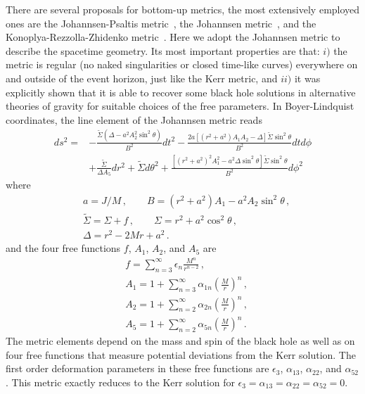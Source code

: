 \documentclass[11pt,a4paper,pdftex]{article}
\begin{document}
There are several proposals for bottom-up metrics, the most extensively employed ones are the Johannsen-Psaltis metric~\cite{JPmetric}, the Johannsen metric~\cite{johannsen_metric}, and the Konoplya-Rezzolla-Zhidenko metric~\cite{KRZmetric}. Here we adopt the Johannsen metric to describe the spacetime geometry. Its most important properties are that: $i)$ the metric is regular (no naked singularities or closed time-like curves) everywhere on and outside of the event horizon, just like the Kerr metric, and $ii)$ it was explicitly shown that it is able to recover some black hole solutions in alternative theories of gravity for suitable choices of the free parameters. In Boyer-Lindquist coordinates, the line element of the Johannsen metric reads~\cite{johannsen_metric}
\begin{align}
ds^2=&-\frac{\tilde{\Sigma}\left(\Delta-a^2A_2^2\sin^2\theta\right)}{B^2}dt^2
-\frac{2a\left[\left(r^2+a^2\right)A_1A_2-\Delta\right]\tilde{\Sigma}\sin^2\theta}{B^2}dtd\phi \nonumber\\
&+\frac{\tilde{\Sigma}}{\Delta A_5}dr^2+\tilde{\Sigma}d\theta^2
+\frac{\left[\left(r^2+a^2\right)^2A_1^2-a^2\Delta\sin^2\theta\right]\tilde{\Sigma}\sin^2\theta}{B^2}d\phi^2
\end{align}
where
\begin{align}
&a=J/M \, , \qquad B=\left(r^2+a^2\right)A_1-a^2A_2\sin^2\theta \, , \nonumber\\
& \tilde{\Sigma}=\Sigma+f \, , \qquad \Sigma=r^2+a^2\cos^2\theta \, , \nonumber\\ 
& \Delta=r^2-2Mr+a^2 \, .
\end{align}
and the four free functions $f$, $A_1$, $A_2$, and $A_5$ are
\begin{align}
& f = \sum^{\infty}_{n=3}\epsilon_n\frac{M^n}{r^{n-2}} \, , \nonumber\\
& A_1 = 1 + \sum_{n=3}^{\infty}\alpha_{1n}\left(\frac{M}{r}\right)^n \, , \nonumber\\
& A_2 = 1 + \sum_{n=2}^{\infty}\alpha_{2n}\left(\frac{M}{r}\right)^n \, , \nonumber\\
& A_5 = 1 + \sum_{n=2}^{\infty}\alpha_{5n}\left(\frac{M}{r}\right)^n \, .
\end{align}
The metric elements depend on the mass and spin of the black hole as well as on four free functions that measure potential deviations from the Kerr solution. The first order deformation parameters in these free functions are $\epsilon_3$, $\alpha_{13}$, $\alpha_{22}$, and $\alpha_{52}$. This metric exactly reduces to the Kerr solution for $\epsilon_3=\alpha_{13}=\alpha_{22}=\alpha_{52}=0$. 
\end{document}
